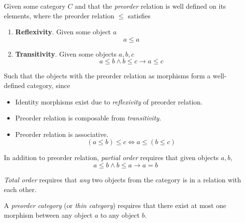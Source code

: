 \begin{definition}
    Given some category $C$ and that the \textit{preorder} relation is well defined on its elements, where the preorder relation $\le$ satisfies
    \begin{enumerate}
        \item \textbf{Reflexivity}. Given some object $a$
        \begin{equation}
            a \le a
        \end{equation}
        \item \textbf{Transitivity}. Given some objects $a, b, c$
        \begin{equation}
            a \le b \land b \le c \to a \le c
        \end{equation}
    \end{enumerate}
    
    Such that the objects with the preorder relation as morphisms form a well-defined category, since
    \begin{itemize}
        \item Identity morphisms exist due to \textit{reflexivity} of preorder relation.
        \item Preorder relation is composable from \textit{transitivity}.
        \item Preorder relation is associative.
        \begin{equation}
            (a \le b) \le c \Leftrightarrow a \le (b \le c)
        \end{equation}
    \end{itemize}
\end{definition}

\begin{definition}
    In addition to preorder relation, \textit{partial order} requires that given objects $a, b$,
    \begin{equation}
        a \le b \land b \le a \to a = b
    \end{equation}
\end{definition}

\begin{definition}
    \textit{Total order} requires that \textit{any} two objects from the category is in a relation with each other.
\end{definition}

\begin{definition}
    A \textit{preorder category} (or \textit{thin category}) requires that there exist at most one morphism between any object $a$ to any object $b$.
\end{definition}

